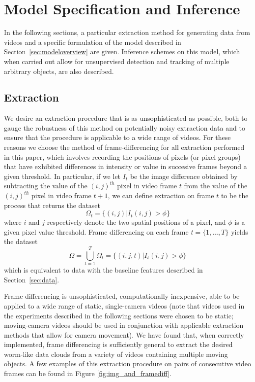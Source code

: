 \documentclass[smallcondensed, final]{svjour3}
\begin{document}
\section{Model Specification and Inference}
\label{sec:modelspec}

In the following sections, a particular extraction method for generating data from videos and a specific formulation of the model described in Section~\ref{sec:modeloverview} are given. Inference schemes on this model, which when carried out allow for unsupervised detection and tracking of multiple arbitrary objects, are also described.



\subsection{Extraction}
\label{sec:modelspec_extraction}

We desire an extraction procedure that is as unsophisticated as possible, both to gauge the robustness of this method on potentially noisy extraction data and to ensure that the procedure is applicable to a wide range of videos. For these reasons we choose the method of frame-differencing for all extraction performed in this paper, which involves recording the positions of pixels (or pixel groups) that have exhibited differences in intensity or value in succesive frames beyond a given threshold. In particular, if we let $I_{t}$ be the image difference obtained by subtracting the value of the $(i,j)^{th}$ pixel in video frame $t$ from the value of the $(i,j)^{th}$ pixel in video frame $t+1$, we can define extraction on frame $t$ to be the process that returns the dataset
\begin{equation}
	\Omega_{t} = \{ (i,j) | I_{t}(i,j) > \phi \}
\end{equation}
where $i$ and $j$ respectively denote the two spatial positions of a pixel, and $\phi$ is a given pixel value threshold. Frame differencing on each frame $t =\{1, \ldots, T \}$ yields the dataset
\begin{equation}
	\Omega = \bigcup_{t=1}^{T} \Omega_{t} = \{ (i,j,t) | I_{t}(i,j) > \phi \}
\end{equation}
which is equivalent to data with the baseline features described in Section~\ref{sec:data}.

Frame differencing is unsophisticated, computationally inexpensive, able to be applied to a wide range of static, single-camera videos (note that videos used in the experiments described in the following sections were chosen to be static; moving-camera videos should be used in conjunction with applicable extraction methods that allow for camera movement). We have found that, when correctly implemented, frame differencing is sufficiently general to extract the desired worm-like data clouds from a variety of videos containing multiple moving objects. A few examples of this extraction procedure on pairs of consecutive video frames can be found in Figure \ref{fig:img_and_framediff}.
\end{document}
